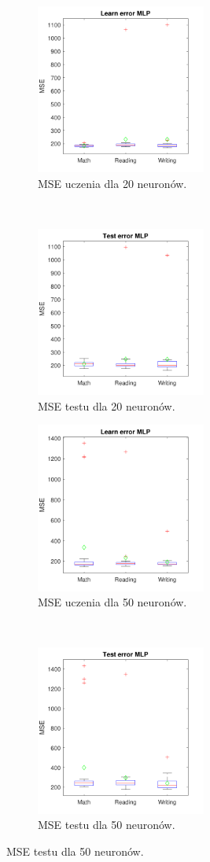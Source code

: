 \documentclass[12pt]{article}
\begin{document}
\begin{figure}[H]
\centering
\begin{subfigure}[t]{0.48\textwidth} 
\centering
\includegraphics[height=2.2in]{tansig_tansig_20_learnBoxplot.pdf}
\caption{MSE uczenia dla 20 neuronów.}
\end{subfigure}
~~
\begin{subfigure}[t]{0.48\textwidth} 
\centering
\includegraphics[height=2.2in]{tansig_tansig_20_testBoxplot.pdf}
\caption{MSE testu dla 20 neuronów.}
\end{subfigure}

\begin{subfigure}[t]{0.48\textwidth} 
\centering
\includegraphics[height=2.2in]{tansig_tansig_50_learnBoxplot.pdf}
\caption{MSE uczenia dla 50 neuronów.}
\end{subfigure}
~~
\begin{subfigure}[t]{0.48\textwidth} 
\centering
\includegraphics[height=2.2in]{tansig_tansig_50_testBoxplot.pdf}
\caption{MSE testu dla 50 neuronów.}
\end{subfigure}


\end{figure}
\end{document}
